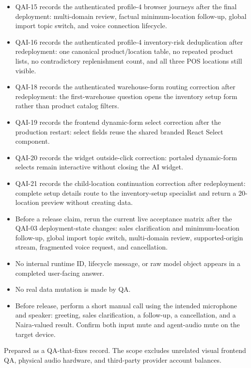 \documentclass[10pt]{article}
\begin{document}
\begin{itemize}[leftmargin=18pt]
\item QAI-15 records the authenticated profile-4 browser journeys after the final deployment: multi-domain review, factual minimum-location follow-up, global import topic switch, and voice connection lifecycle.
\item QAI-16 records the authenticated profile-4 inventory-risk deduplication after redeployment: one canonical product/location table, no repeated product lists, no contradictory replenishment count, and all three POS locations still visible.
\item QAI-18 records the authenticated warehouse-form routing correction after redeployment: the first-warehouse question opens the inventory setup form rather than product catalog filters.
\item QAI-19 records the frontend dynamic-form select correction after the production restart: select fields reuse the shared branded React Select component.
\item QAI-20 records the widget outside-click correction: portaled dynamic-form selects remain interactive without closing the AI widget.
\item QAI-21 records the child-location continuation correction after redeployment: complete setup details route to the inventory-setup specialist and return a 20-location preview without creating data.
\item Before a release claim, rerun the current live acceptance matrix after the QAI-03 deployment-state changes: sales clarification and minimum-location follow-up, global import topic switch, multi-domain review, supported-origin stream, fragmented voice request, and cancellation.
\item No internal runtime ID, lifecycle message, or raw model object appears in a completed user-facing answer.
\item No real data mutation is made by QA.
\item Before release, perform a short manual call using the intended microphone and speaker: greeting, sales clarification, a follow-up, a cancellation, and a Naira-valued result. Confirm both input mute and agent-audio mute on the target device.
\end{itemize}

\vfill
{\small\color{gray}Prepared as a QA-that-fixes record. The scope excludes unrelated visual frontend QA, physical audio hardware, and third-party provider account balances.}
\end{document}
